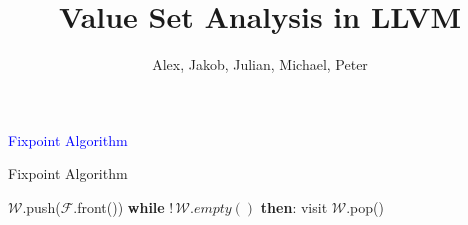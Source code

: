 \documentclass[10pt,handout]{beamer}
\author{Alex, Jakob, Julian, Michael, Peter}
\title{Value Set Analysis in LLVM}
\institute{IN2053 - Program Optimization Lab 2018}
\begin{document}
\begin{frame}
\titlepage
\end{frame}


\newcommand{\linen}[2]{ &&\qquad #1 & #2 \\}
\newcommand{\linenn}[4]{#1 & #2 &\qquad #3 & #4 \\}
\newcommand{\linel}[1]{ &&#1 \\}

\usetikzlibrary{decorations.text}
\newcommand*{\mytextstylee}{\sffamily\bfseries\color{white!85}}
\newcommand*{\mytextstyle}{\sffamily\bfseries\color{black!85}}
\newcommand{\arcarrow}[3]{%
   \pgfmathsetmacro{\rin}{2.5}
   \pgfmathsetmacro{\rmid}{3.0}
   \pgfmathsetmacro{\rout}{3.5}
   \pgfmathsetmacro{\astart}{#1}
   \pgfmathsetmacro{\aend}{#2}
   \pgfmathsetmacro{\atip}{5}
   \fill[mygray, very thick] (\astart+\atip:\rin)
                         arc (\astart+\atip:\aend:\rin)
      -- (\aend-\atip:\rmid)
      -- (\aend:\rout)   arc (\aend:\astart+\atip:\rout)
      -- (\astart:\rmid) -- cycle;
   \path[
      decoration = {
         text along path,
         text = {|\mytextstyle|#3},
         text align = {align = center},
         raise = -1.0ex
      },
      decorate
   ](\astart+\atip:\rmid) arc (\astart+\atip:\aend+\atip:\rmid);
}
\newcommand{\arcarroww}[3]{%
   \pgfmathsetmacro{\rin}{2.5}
   \pgfmathsetmacro{\rmid}{3.0}
   \pgfmathsetmacro{\rout}{3.5}
   \pgfmathsetmacro{\astart}{#1}
   \pgfmathsetmacro{\aend}{#2}
   \pgfmathsetmacro{\atip}{5}
   \fill[blue, very thick] (\astart+\atip:\rin)
                         arc (\astart+\atip:\aend:\rin)
      -- (\aend-\atip:\rmid)
      -- (\aend:\rout)   arc (\aend:\astart+\atip:\rout)
      -- (\astart:\rmid) -- cycle;
   \path[
      decoration = {
         text along path,
         text = {|\mytextstylee|#3},
         text align = {align = center},
         raise = -1.0ex
      },
      decorate
   ](\astart+\atip:\rmid) arc (\astart+\atip:\aend+\atip:\rmid);
}


\begin{frame}[fragile]{\textcolor{blue}{Fixpoint Algorithm}}
\begin{algorithm}[H]
\caption{Fixpoint Algorithm}
\begin{algorithmic}[1]
\State $\mathcal{W}$.push($\mathcal{F}$.front())
\State \textbf{while} $!\, \mathcal{W}.empty()$ \textbf{then}:
\State \qquad visit $\mathcal{W}$.pop()
\EndProcedure
\end{algorithmic}
\end{algorithm}
\end{frame}
\end{document}
